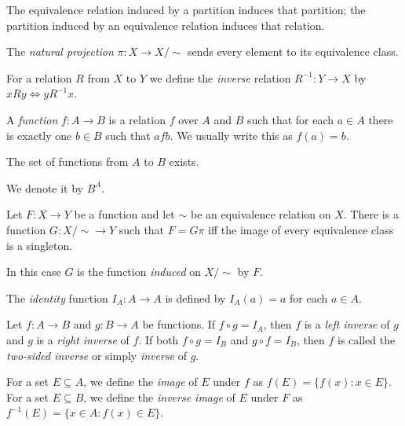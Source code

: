 \begin{prop}
  The equivalence relation induced by a partition induces that partition; the
  partition induced by an equivalence relation induces that relation.
\end{prop}
\begin{defn}
    The \emph{natural projection} $\pi:X\to X/\sim$ sends every element to its
    equivalence class.
\end{defn}
\begin{defn}
  For a relation $R$ from $X$ to $Y$ we define the \emph{inverse} relation
  $R^{-1}:Y\to X$ by $xRy\iff yR^{-1}x$.
\end{defn}
\begin{defn}
  A \emph{function} $f:A\to B$ is a relation $f$ over $A$ and $B$ such that
  for each $a\in A$ there is exactly one $b\in B$ such that $afb$. We usually
  write this as $f(a)=b$.
\end{defn}
\begin{prop}
    The set of functions from $A$ to $B$ exists.
\end{prop}
\begin{defn}
    We denote it by $B^A$.
\end{defn}
\begin{prop}
    Let $F:X\to Y$ be a function and let $\sim$ be an equivalence relation on
    $X$. There is a function $G:X/\sim\to Y$ such that $F=G\pi$ iff the image of
    every equivalence class is a singleton.
\end{prop}
\begin{defn}
    In this case $G$ is the function \emph{induced} on $X/\sim$ by $F$.
\end{defn}
\begin{defn}
  The \emph{identity} function $I_A:A\to A$ is defined by $I_A(a)=a$ for each
  $a\in A$.
\end{defn}
\begin{defn}
  Let $f:A\to B$ and $g:B\to A$ be functions. If $f\circ g=I_A$, then $f$ is a
  \emph{left inverse} of $g$ and $g$ is a \emph{right inverse} of $f$. If both
  $f\circ g=I_B$ and $g\circ f=I_B$, then $f$ is called the \emph{two-sided
  inverse} or simply \emph{inverse} of $g$.
\end{defn}
\begin{defn}
  For a set $E\subseteq A$, we define the \emph{image} of $E$ under $f$ as
  $f(E)=\{f(x):x\in E\}$. For a set $E\subseteq B$, we define the \emph{inverse
    image} of $E$ under $F$ as $f^{-1}(E)=\{x\in A:f(x)\in E\}$.
\end{defn}
